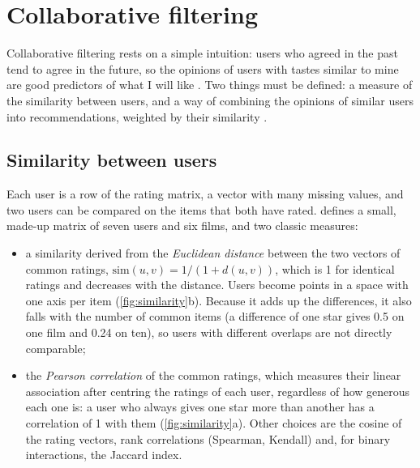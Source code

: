 \section{Collaborative filtering}\label{sec:cf}

Collaborative filtering rests on a simple intuition: users who agreed in the past tend to agree in the future,
so the opinions of users with tastes similar to mine are good predictors of what I will like
\citep{resnick1994grouplens}. Two things must be defined: a measure of the similarity between users, and a way
of combining the opinions of similar users into recommendations, weighted by their similarity
\citep{segaran2007programming}.

\subsection{Similarity between users}

Each user is a row of the rating matrix, a vector with many missing values, and two users can be compared on the
items that both have rated.  defines a small, made-up matrix of seven users and six films, and
two classic measures:
\begin{itemize}
  \item a similarity derived from the \emph{Euclidean distance} between the two vectors of common ratings,
        $\mathrm{sim}(u,v)=1/(1+d(u,v))$, which is 1 for identical ratings and decreases with the distance. Users
        become points in a space with one axis per item (\cref{fig:similarity}b). Because it adds up the
        differences, it also falls with the number of common items (a difference of one star gives 0.5 on one
        film and 0.24 on ten), so users with different overlaps are not directly comparable;
  \item the \emph{Pearson correlation} of the common ratings, which measures their linear association after
        centring the ratings of each user, regardless of how generous each one is: a user who always gives one star more than another
        has a correlation of 1 with them (\cref{fig:similarity}a). Other choices are the cosine of the rating
        vectors, rank correlations (Spearman, Kendall) and, for binary interactions, the Jaccard index.
\end{itemize}

